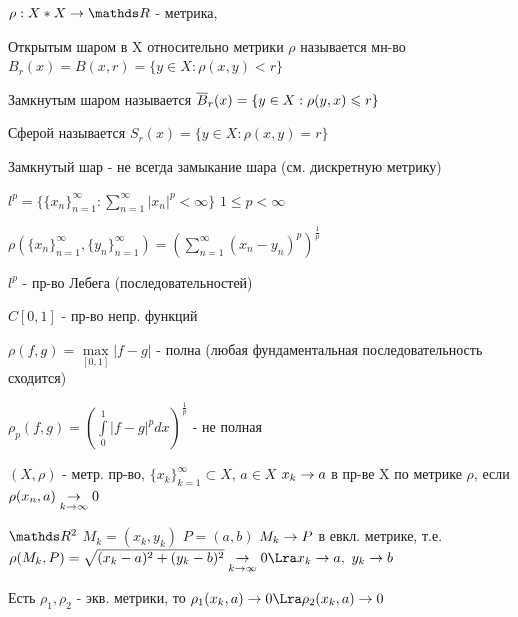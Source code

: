 \documentclass[12pt, fleqn]{article}
\begin{document}
\begin{definition}
    $\rho: X*X \ra \R$ - метрика, 
    
    Открытым шаром в X относительно метрики $\rho$ называется мн-во $B_r(x)=B(x,r)=\{y \in X: \rho(x,y) < r \}$
    
    Замкнутым шаром называется $\overline{B}_r(x)=\{y \in X: \rho(y,x) \leqslant r \}$
    
    Сферой называется $S_r(x)=\{y \in X: \rho(x,y)=r \}$
\end{definition}

\begin{upr}
    Замкнутый шар - не всегда замыкание шара (см. дискретную метрику)
\end{upr}

\begin{example}
    $l^p=\{ \{x_n\}_{n=1}^\infty: \sum\limits_{n=1}^\infty |x_n|^p < \infty \}$ $1 \leqslant p < \infty$
    
    $\rho(\{x_n\}_{n=1}^\infty, \{y_n\}_{n=1}^\infty) = (\sum\limits_{n=1}^\infty (x_n-y_n)^p)^{\frac{1}{p}}$
    
    $l^p$ - пр-во Лебега (последовательностей)
\end{example}

\begin{example}
    $C[0,1]$ - пр-во непр. функций
    
    $\rho(f,g)=\max\limits_{[0,1]} |f-g|$ - полна (любая фундаментальная последовательность сходится)
    
    $\rho_p(f,g)=(\int\limits_0^1 |f-g|^p dx)^{\frac{1}{p}}$ - не полная
\end{example}

\begin{definition}
    $(X, \rho)$ - метр. пр-во, $\{x_k\}_{k=1}^\infty \subset X$, $a \in X$ $x_k \rightarrow a$ в пр-ве X по метрике $\rho$, если $\rho(x_n,a) \underset{k \rightarrow \infty}{\rightarrow} 0$
\end{definition}

\begin{examples}
    $\R^2$ $M_k=(x_k, y_k)$ $P=(a,b)$ $M_k \rightarrow P$ в евкл. метрике, т.е. $\rho(M_k,P)=\sqrt{(x_k-a)^2+(y_k-b)^2} \us{k \ra \infty}{\ra} 0 \Lra x_k \ra a,\ y_k \ra b$
\end{examples}

\begin{remark}
    Есть $\rho_1,\rho_2$ - экв. метрики, то $\rho_1(x_k,a) \ra 0 \Lra \rho_2(x_k,a) \ra 0$
\end{remark}
\end{document}
